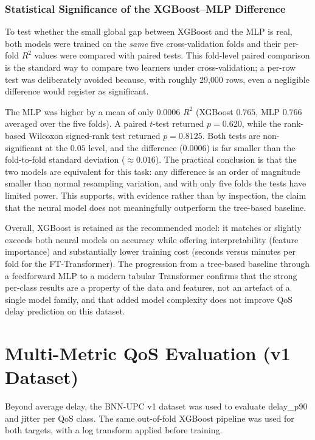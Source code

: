 \documentclass[a4paper,12pt]{Classes/RoboticsLaTeX}
\begin{document}
\subsubsection{Statistical Significance of the XGBoost--MLP Difference}
\label{sec:significance}

To test whether the small global gap between XGBoost and the MLP is real, both models were trained on the \emph{same} five cross-validation folds and their per-fold $R^2$ values were compared with paired tests. This fold-level paired comparison is the standard way to compare two learners under cross-validation; a per-row test was deliberately avoided because, with roughly 29{,}000 rows, even a negligible difference would register as significant.

The MLP was higher by a mean of only $0.0006$ $R^2$ (XGBoost $0.765$, MLP $0.766$ averaged over the five folds). A paired $t$-test returned $p = 0.620$, while the rank-based Wilcoxon signed-rank test returned $p = 0.8125$. Both tests are non-significant at the $0.05$ level, and the difference ($0.0006$) is far smaller than the fold-to-fold standard deviation ($\approx 0.016$). The practical conclusion is that the two models are equivalent for this task: any difference is an order of magnitude smaller than normal resampling variation, and with only five folds the tests have limited power. This supports, with evidence rather than by inspection, the claim that the neural model does not meaningfully outperform the tree-based baseline.

Overall, XGBoost is retained as the recommended model: it matches or slightly exceeds both neural models on accuracy while offering interpretability (feature importance) and substantially lower training cost (seconds versus minutes per fold for the FT-Transformer). The progression from a tree-based baseline through a feedforward MLP to a modern tabular Transformer confirms that the strong per-class results are a property of the data and features, not an artefact of a single model family, and that added model complexity does not improve QoS delay prediction on this dataset.

\section{Multi-Metric QoS Evaluation (v1 Dataset)}

Beyond average delay, the BNN-UPC v1 dataset was used to evaluate delay\_p90 and jitter per QoS class. The same out-of-fold XGBoost pipeline was used for both targets, with a log transform applied before training.
\end{document}
